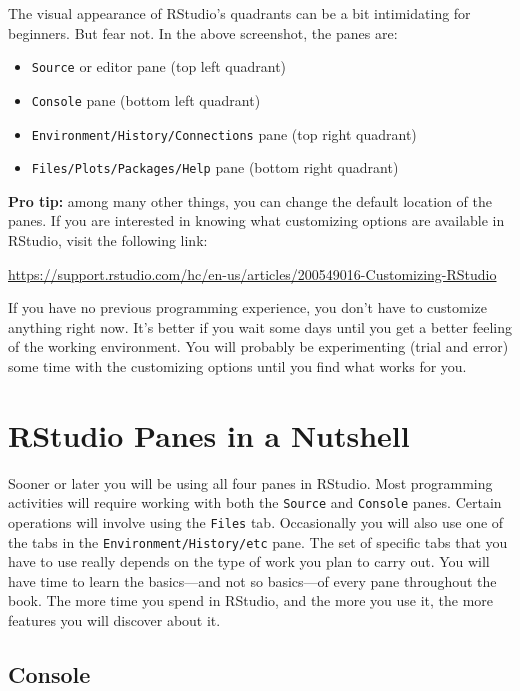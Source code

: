 \documentclass[
]{book}
\begin{document}
The visual appearance of RStudio's quadrants can be a bit intimidating for
beginners. But fear not. In the above screenshot, the panes are:

\begin{itemize}
\item
  \texttt{Source} or editor pane (top left quadrant)
\item
  \texttt{Console} pane (bottom left quadrant)
\item
  \texttt{Environment/History/Connections} pane (top right quadrant)
\item
  \texttt{Files/Plots/Packages/Help} pane (bottom right quadrant)
\end{itemize}

\textbf{Pro tip:} among many other things, you can change the default location of the panes. If you are interested in knowing what customizing options are available
in RStudio, visit the following link:

\url{https://support.rstudio.com/hc/en-us/articles/200549016-Customizing-RStudio}

If you have no previous programming experience, you don't have to customize
anything right now. It's better if you wait some days until you get a better
feeling of the working environment. You will probably be experimenting (trial
and error) some time with the customizing options until you find what works for
you.

\hypertarget{rstudio-panes-in-a-nutshell}{%
\section{RStudio Panes in a Nutshell}\label{rstudio-panes-in-a-nutshell}}

Sooner or later you will be using all four panes in RStudio. Most programming
activities will require working with both the \texttt{Source} and \texttt{Console} panes.
Certain operations will involve using the \texttt{Files} tab. Occasionally you will
also use one of the tabs in the \texttt{Environment/History/etc} pane. The set of
specific tabs that you have to use really depends on the type of work you plan
to carry out. You will have time to learn the basics---and not so basics---of
every pane throughout the book. The more time you spend in RStudio, and the
more you use it, the more features you will discover about it.

\hypertarget{console}{%
\subsection{Console}\label{console}}
\end{document}
